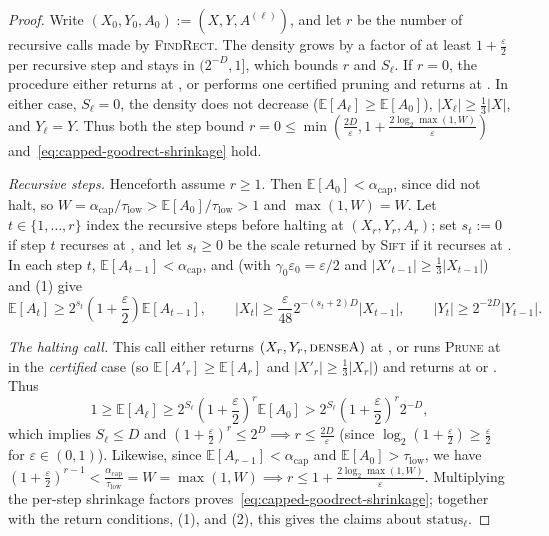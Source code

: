 \documentclass[11pt]{article}
\theoremstyle{definition}
\newcommand{\E}{\mathbb{E}}
\newcommand{\abs}[1]{\left\lvert #1 \right\rvert}
\newcommand{\dens}[1]{\E[#1]}
\newcommand{\Prune}{\textnormal{\textsc{Prune}}}
\newcommand{\Sift}{\textnormal{\textsc{Sift}}}
\newcommand{\FindRect}{\textnormal{\textsc{FindRect}}}
\newcommand{\tagdenseA}{\textnormal{\textsc{denseA}}}
\begin{document}
\begin{proof}
Write $(X_0, Y_0, A_0) := (X, Y, A^{(\ell)})$, and let $r$ be the number of recursive calls made by \FindRect{}. The density grows by a factor of at least $1 + \frac{\varepsilon}{2}$ per recursive step and stays in $(2^{-D}, 1]$, which bounds $r$ and $S_\ell$. If $r = 0$, the procedure either returns at , or performs one certified pruning and returns at . In either case, $S_\ell = 0$, the density does not decrease ($\dens{A_\ell} \ge \dens{A_0}$), $\abs{X_\ell} \ge \frac{1}{3}\abs{X}$, and $Y_\ell = Y$. Thus both the step bound $r = 0 \le \min(\frac{2D}{\varepsilon}, 1 + \frac{2\log_2 \max(1, W)}{\varepsilon})$ and~\eqref{eq:capped-goodrect-shrinkage} hold.

\emph{Recursive steps.} Henceforth assume $r \ge 1$. Then $\dens{A_0} < \alpha_{\text{cap}}$, since  did not halt, so $W = \alpha_{\text{cap}}/\tau_{\text{low}} > \dens{A_0}/\tau_{\text{low}} > 1$ and $\max(1, W) = W$. Let $t \in \{1, \dots, r\}$ index the recursive steps before halting at $(X_r, Y_r, A_r)$; set $s_t := 0$ if step $t$ recurses at , and let $s_t \ge 0$ be the scale returned by \Sift{} if it recurses at . In each step $t$, $\dens{A_{t-1}} < \alpha_{\text{cap}}$, and  (with $\gamma_0\varepsilon_0 = \varepsilon/2$ and $\abs{X'_{t-1}} \ge \frac{1}{3}\abs{X_{t-1}}$) and (1) give
\[
    \dens{A_t} \ge 2^{s_t}\left(1 + \frac{\varepsilon}{2}\right)\dens{A_{t-1}}, \qquad
    \abs{X_t} \ge \frac{\varepsilon}{48} 2^{-(s_t+2)D}\abs{X_{t-1}}, \qquad
    \abs{Y_t} \ge 2^{-2D}\abs{Y_{t-1}}.
\]

\emph{The halting call.} This call either returns $(X_r, Y_r, \tagdenseA)$ at , or runs \Prune{} at  in the \emph{certified} case (so $\dens{A'_r} \ge \dens{A_r}$ and $\abs{X'_r} \ge \frac{1}{3}\abs{X_r}$) and returns at  or . Thus
\[
    1 \ge \dens{A_\ell} \ge 2^{S_\ell}\left(1 + \frac{\varepsilon}{2}\right)^r \dens{A_0} > 2^{S_\ell}\left(1 + \frac{\varepsilon}{2}\right)^r 2^{-D},
\]
which implies $S_\ell \le D$ and $(1 + \frac{\varepsilon}{2})^r \le 2^D \implies r \le \frac{2D}{\varepsilon}$ (since $\log_2(1 + \frac{\varepsilon}{2}) \ge \frac{\varepsilon}{2}$ for $\varepsilon \in (0, 1)$). Likewise, since $\dens{A_{r-1}} < \alpha_{\text{cap}}$ and $\dens{A_0} > \tau_{\text{low}}$, we have $(1 + \frac{\varepsilon}{2})^{r-1} < \frac{\alpha_{\text{cap}}}{\tau_{\text{low}}} = W = \max(1, W) \implies r \le 1 + \frac{2\log_2 \max(1, W)}{\varepsilon}$. Multiplying the per-step shrinkage factors proves~\eqref{eq:capped-goodrect-shrinkage}; together with the return conditions, (1), and (2), this gives the claims about $\text{status}_\ell$.
\end{proof}
\end{document}

